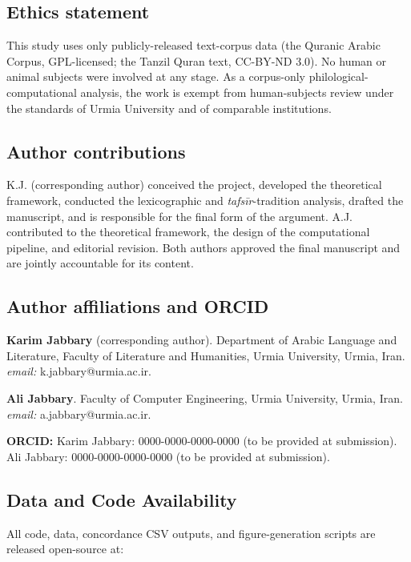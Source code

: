\subsection{Ethics statement}\label{ethics-statement}

This study uses only publicly-released text-corpus data (the Quranic
Arabic Corpus, GPL-licensed; the Tanzil Quran text, CC-BY-ND 3.0). No
human or animal subjects were involved at any stage. As a corpus-only
philological-computational analysis, the work is exempt from
human-subjects review under the standards of Urmia University and of
comparable institutions.

\subsection{Author contributions}\label{author-contributions}

K.J. (corresponding author) conceived the project, developed the
theoretical framework, conducted the lexicographic and
\emph{tafsīr}-tradition analysis, drafted the manuscript, and is
responsible for the final form of the argument. A.J. contributed to the
theoretical framework, the design of the computational pipeline, and
editorial revision. Both authors approved the final manuscript and are
jointly accountable for its content.

\subsection{Author affiliations and
ORCID}\label{author-affiliations-and-orcid}

\textbf{Karim Jabbary} (corresponding author). Department of Arabic
Language and Literature, Faculty of Literature and Humanities, Urmia
University, Urmia, Iran. \emph{email:} k.jabbary@urmia.ac.ir.

\textbf{Ali Jabbary}. Faculty of Computer Engineering, Urmia University,
Urmia, Iran. \emph{email:} a.jabbary@urmia.ac.ir.

\textbf{ORCID:} Karim Jabbary: 0000-0000-0000-0000 (to be provided at
submission). Ali Jabbary: 0000-0000-0000-0000 (to be provided at
submission).

\subsection{Data and Code
Availability}\label{data-and-code-availability}

All code, data, concordance CSV outputs, and figure-generation scripts
are released open-source at:

